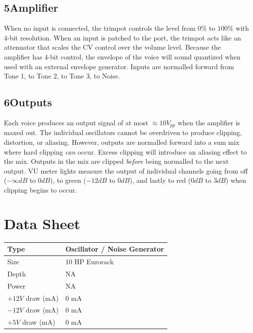 \documentclass[12pt,letter]{article}
\begin{document}
\subsection*{5{\quad}Amplifier}

When no input is connected, the trimpot controls the level from $0\%$ to $100\%$ with 4-bit resolution. When an input is patched to the port, the trimpot acts like an attenuator that scales the CV control over the volume level. Because the amplifier has 4-bit control, the envelope of the voice will sound quantized when used with an external envelope generator. Inputs are normalled forward from Tone 1, to Tone 2, to Tone 3, to Noise.

\subsection*{6{\quad}Outputs}

Each voice produces an output signal of at most ${\approx}10V_{pp}$ when the amplifier is maxed out. The individual oscillators cannot be overdriven to produce clipping, distortion, or aliasing. However, outputs are normalled forward into a sum mix where hard clipping \textit{can} occur. Excess clipping will introduce an aliasing effect to the mix. Outputs in the mix are clipped \textit{before} being normalled to the next output. VU meter lights measure the output of individual channels going from off ($-\infty dB$ to $0dB$), to green ($-12dB$ to $0dB$), and lastly to red ($0dB$ to $3dB$) when clipping begins to occur.


\clearpage
\section*{Data Sheet}

\begin{table}[!htp]
\begin{tabular}{|l|l|}
\hline
Type             & Oscillator / Noise Generator  \\
\hline
Size             & 10 HP Eurorack           \\
\hline
Depth            & NA                       \\
\hline
Power            & NA                       \\ %
\hline
$+12V$ draw (mA) & 0 mA                     \\
\hline
$-12V$ draw (mA) & 0 mA                     \\
\hline
$+5V$ draw (mA)  & 0 mA                     \\
\hline
\end{tabular}
\end{table}


\clearpage
\renewcommand\refname{References \& Acknowledgments}
\nocite{*}


\end{document}
